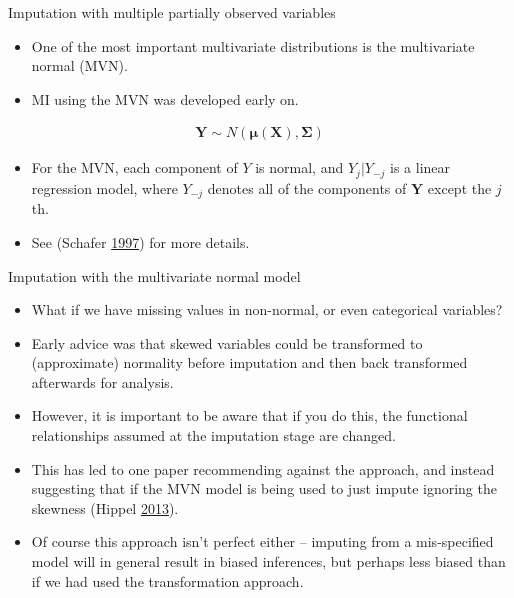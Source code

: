 \documentclass[ignorenonframetext,]{beamer}
\providecommand{\tightlist}{%
  \setlength{\itemsep}{0pt}\setlength{\parskip}{0pt}}
\begin{document}
\begin{frame}{Imputation with multiple partially observed variables}
\protect\hypertarget{imputation-with-multiple-partially-observed-variables-1}{}

\begin{itemize}
\tightlist
\item
  One of the most important multivariate distributions is the
  multivariate normal (MVN).
\item
  MI using the MVN was developed early on.
\end{itemize}

\begin{eqnarray*}
\mathbf Y \sim N(\boldsymbol \mu(\mathbf X), \boldsymbol \Sigma)
\end{eqnarray*}

\begin{itemize}
\item
  For the MVN, each component of \(Y\) is normal, and \(Y_{j}|Y_{-j}\)
  is a linear regression model, where \(Y_{-j}\) denotes all of the
  components of \(\mathbf Y\) except the \(j\)th.
\item
  See (Schafer \protect\hyperlink{ref-Schafer:1997}{1997}) for more
  details.
\end{itemize}

\end{frame}

\begin{frame}{Imputation with the multivariate normal model}
\protect\hypertarget{imputation-with-the-multivariate-normal-model}{}

\begin{itemize}
\tightlist
\item
  What if we have missing values in non-normal, or even categorical
  variables?
\item
  Early advice was that skewed variables could be transformed to
  (approximate) normality before imputation and then back transformed
  afterwards for analysis.
\item
  However, it is important to be aware that if you do this, the
  functional relationships assumed at the imputation stage are changed.
\item
  This has led to one paper recommending against the approach, and
  instead suggesting that if the MVN model is being used to just impute
  ignoring the skewness (Hippel
  \protect\hyperlink{ref-vonHippel2013}{2013}).
\item
  Of course this approach isn't perfect either -- imputing from a
  mis-specified model will in general result in biased inferences, but
  perhaps less biased than if we had used the transformation approach.
\end{itemize}

\end{frame}
\end{document}
